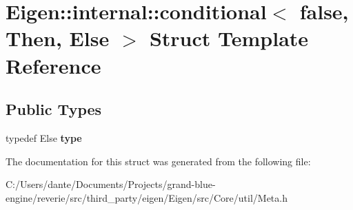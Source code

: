 \hypertarget{struct_eigen_1_1internal_1_1conditional_3_01false_00_01_then_00_01_else_01_4}{}\section{Eigen\+::internal\+::conditional$<$ false, Then, Else $>$ Struct Template Reference}
\label{struct_eigen_1_1internal_1_1conditional_3_01false_00_01_then_00_01_else_01_4}
\subsection*{Public Types}
\begin{DoxyCompactItemize}
\item 
\mbox{\label{struct_eigen_1_1internal_1_1conditional_3_01false_00_01_then_00_01_else_01_4_ab754baa99b87660a6bd1b30769da3753}} 
typedef Else {\bfseries type}
\end{DoxyCompactItemize}


The documentation for this struct was generated from the following file\+:\begin{DoxyCompactItemize}
\item 
C\+:/\+Users/dante/\+Documents/\+Projects/grand-\/blue-\/engine/reverie/src/third\+\_\+party/eigen/\+Eigen/src/\+Core/util/Meta.\+h\end{DoxyCompactItemize}
